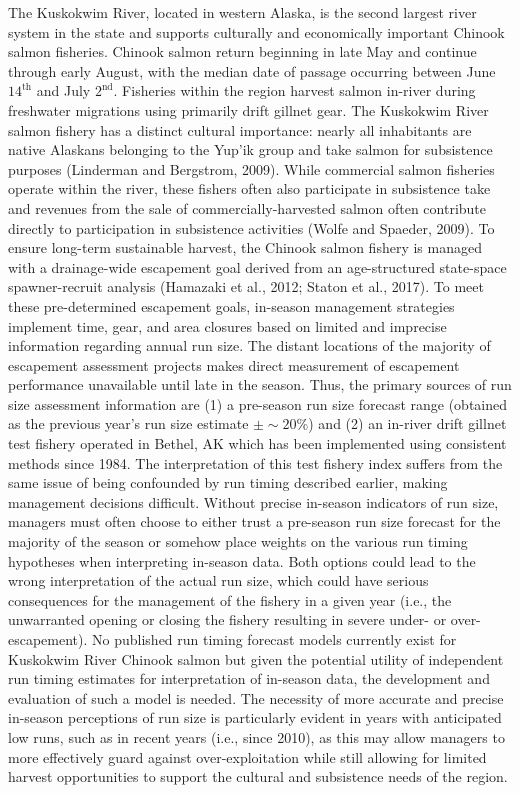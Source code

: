 \documentclass[12pt,]{book}
\theoremstyle{definition}
\theoremstyle{definition}
\theoremstyle{definition}
\theoremstyle{remark}
\begin{document}
The Kuskokwim River, located in western Alaska, is the second largest
river system in the state and supports culturally and economically
important Chinook salmon fisheries. Chinook salmon return beginning in
late May and continue through early August, with the median date of
passage occurring between June \(14^{\text{th}}\) and July
\(2^{\text{nd}}\). Fisheries within the region harvest salmon in-river
during freshwater migrations using primarily drift gillnet gear. The
Kuskokwim River salmon fishery has a distinct cultural importance:
nearly all inhabitants are native Alaskans belonging to the Yup'ik group
and take salmon for subsistence purposes (Linderman and Bergstrom,
2009). While commercial salmon fisheries operate within the river, these
fishers often also participate in subsistence take and revenues from the
sale of commercially-harvested salmon often contribute directly to
participation in subsistence activities (Wolfe and Spaeder, 2009). To
ensure long-term sustainable harvest, the Chinook salmon fishery is
managed with a drainage-wide escapement goal derived from an
age-structured state-space spawner-recruit analysis (Hamazaki et al.,
2012; Staton et al., 2017). To meet these pre-determined escapement
goals, in-season management strategies implement time, gear, and area
closures based on limited and imprecise information regarding annual run
size. The distant locations of the majority of escapement assessment
projects makes direct measurement of escapement performance unavailable
until late in the season. Thus, the primary sources of run size
assessment information are (1) a pre-season run size forecast range
(obtained as the previous year's run size estimate \(\pm \sim 20\%\))
and (2) an in-river drift gillnet test fishery operated in Bethel, AK
which has been implemented using consistent methods since 1984. The
interpretation of this test fishery index suffers from the same issue of
being confounded by run timing described earlier, making management
decisions difficult. Without precise in-season indicators of run size,
managers must often choose to either trust a pre-season run size
forecast for the majority of the season or somehow place weights on the
various run timing hypotheses when interpreting in-season data. Both
options could lead to the wrong interpretation of the actual run size,
which could have serious consequences for the management of the fishery
in a given year (i.e., the unwarranted opening or closing the fishery
resulting in severe under- or over-escapement). No published run timing
forecast models currently exist for Kuskokwim River Chinook salmon but
given the potential utility of independent run timing estimates for
interpretation of in-season data, the development and evaluation of such
a model is needed. The necessity of more accurate and precise in-season
perceptions of run size is particularly evident in years with
anticipated low runs, such as in recent years (i.e., since 2010), as
this may allow managers to more effectively guard against
over-exploitation while still allowing for limited harvest opportunities
to support the cultural and subsistence needs of the region.
\end{document}
